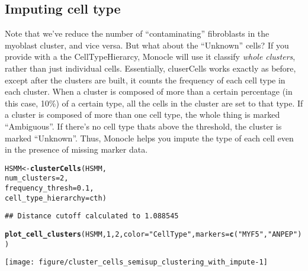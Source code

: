 \documentclass[10pt,oneside]{article}\usepackage[]{graphicx}\usepackage[]{color}
\makeatletter
\def\maxwidth{ %
  \ifdim\Gin@nat@width>\linewidth
    \linewidth
  \else
    \Gin@nat@width
  \fi
}
\newcommand{\hlnum}[1]{\textcolor[rgb]{0.686,0.059,0.569}{#1}}%
\newcommand{\hlstr}[1]{\textcolor[rgb]{0.192,0.494,0.8}{#1}}%
\newcommand{\hlstd}[1]{\textcolor[rgb]{0.345,0.345,0.345}{#1}}%
\newcommand{\hlkwb}[1]{\textcolor[rgb]{0.69,0.353,0.396}{#1}}%
\newcommand{\hlkwc}[1]{\textcolor[rgb]{0.333,0.667,0.333}{#1}}%
\newcommand{\hlkwd}[1]{\textcolor[rgb]{0.737,0.353,0.396}{\textbf{#1}}}%
\newenvironment{kframe}{%
 \def\at@end@of@kframe{}%
 \ifinner\ifhmode%
  \def\at@end@of@kframe{\end{minipage}}%
  \begin{minipage}{\columnwidth}%
 \fi\fi%
 \def\FrameCommand##1{\hskip\@totalleftmargin \hskip-\fboxsep
 \colorbox{shadecolor}{##1}\hskip-\fboxsep
     \hskip-\linewidth \hskip-\@totalleftmargin \hskip\columnwidth}%
 \MakeFramed {\advance\hsize-\width
   \@totalleftmargin\z@ \linewidth\hsize
   \@setminipage}}%
 {\par\unskip\endMakeFramed%
 \at@end@of@kframe}
\newenvironment{knitrout}{}{} %
\makeatother
\begin{document}
 \subsection{Imputing cell type}
 
 Note that we've reduce the number of ``contaminating'' fibroblasts in the myoblast cluster, and vice versa. But what about the ``Unknown'' cells? If you provide  with a the CellTypeHierarcy, Monocle will use it classify \emph{whole clusters}, rather than just individual cells. Essentially, cluserCells works exactly as before, except after the clusters are built, it counts the frequency of each cell type in each cluster. When a cluster is composed of more than a certain percentage (in this case, 10\%) of a certain type, all the cells in the cluster are set to that type. If a cluster is composed of more than one cell type, the whole thing is marked ``Ambiguous''. If there's no cell type thats above the threshold, the cluster is marked ``Unknown''. Thus, Monocle helps you impute the type of each cell even in the presence of missing marker data.
 
\begin{knitrout}
\color{fgcolor}\begin{kframe}
\begin{alltt}
\hlstd{HSMM} \hlkwb{<-} \hlkwd{clusterCells}\hlstd{(HSMM,}
                     \hlkwc{num_clusters}\hlstd{=}\hlnum{2}\hlstd{,}
                     \hlkwc{frequency_thresh}\hlstd{=}\hlnum{0.1}\hlstd{,}
                     \hlkwc{cell_type_hierarchy}\hlstd{=cth)}
\end{alltt}
\begin{verbatim}
## Distance cutoff calculated to 1.088545
\end{verbatim}


{\ttfamily\noindent\itshape\color{messagecolor}{\#\# the length of the distance: 34191}}\begin{alltt}
\hlkwd{plot_cell_clusters}\hlstd{(HSMM,} \hlnum{1}\hlstd{,} \hlnum{2}\hlstd{,} \hlkwc{color}\hlstd{=}\hlstr{"CellType"}\hlstd{,} \hlkwc{markers} \hlstd{=} \hlkwd{c}\hlstd{(}\hlstr{"MYF5"}\hlstd{,} \hlstr{"ANPEP"}\hlstd{))}
\end{alltt}
\end{kframe}

{\centering \texttt{[image: figure/cluster\_cells\_semisup\_clustering\_with\_impute-1]} 

}



\end{knitrout}
 
\end{document}
